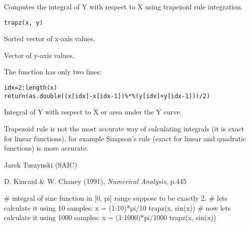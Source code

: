 \begin{Description}\relax
Computes the integral of Y with respect to X using trapezoid rule 
integration.
\end{Description}
\begin{Usage}
\begin{verbatim}trapz(x, y)\end{verbatim}
\end{Usage}
\begin{Arguments}
\begin{ldescription}
\item[\code{x}] Sorted vector of x-axis values. 
\item[\code{y}] Vector of y-axis values. 
\end{ldescription}
\end{Arguments}
\begin{Details}\relax
The function has only two lines:
\begin{alltt}
    idx = 2:length(x)
    return (as.double( (x[idx] - x[idx-1]) \%*\% (y[idx] + y[idx-1])) / 2)
\end{alltt}
\end{Details}
\begin{Value}
Integral of Y with respect to X or area under the Y curve.
\end{Value}
\begin{Note}\relax
Trapezoid rule is not the most accurate way of calculating integrals (it is 
exact for linear functions), for example Simpson's rule (exact for linear and 
quadratic functions) is more accurate.
\end{Note}
\begin{Author}\relax
Jarek Tuszynski (SAIC) 
\end{Author}
\begin{References}\relax
D. Kincaid \& W. Chaney (1991), \emph{Numerical Analysis}, p.445
\end{References}
\begin{SeeAlso}\relax
{}
\end{SeeAlso}
\begin{Examples}
\begin{ExampleCode}
  # integral of sine function in [0, pi] range suppose to be exactly 2.
  # lets calculate it using 10 samples:
  x = (1:10)*pi/10
  trapz(x, sin(x))
  # now lets calculate it using 1000 samples:
  x = (1:1000)*pi/1000
  trapz(x, sin(x))
\end{ExampleCode}
\end{Examples}

